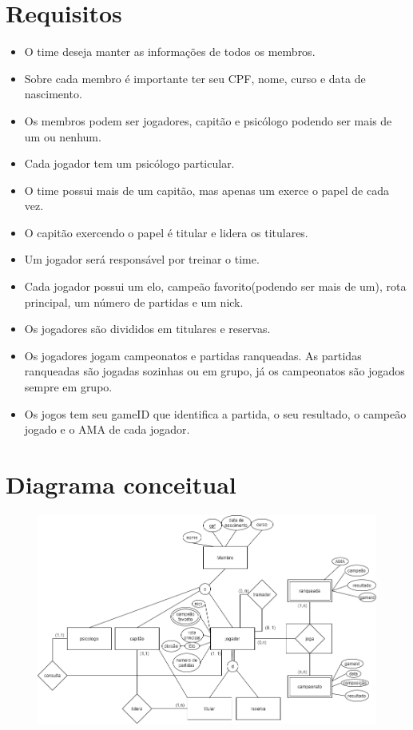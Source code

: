 \documentclass[]{article}
\begin{document}
\section{Requisitos}
\begin{itemize}
    \item O time deseja manter as informações de todos os membros.
    \item Sobre cada membro é importante ter seu CPF, nome, curso e data de nascimento.
    \item Os membros podem ser jogadores, capitão e psicólogo podendo ser mais de um ou nenhum.
    \item Cada jogador tem um psicólogo particular.
    \item O time possui mais de um capitão, mas apenas um exerce o papel de cada vez.
    \item O capitão exercendo o papel é titular e lidera os titulares.
    \item Um jogador será responsável por treinar o time.
    \item Cada jogador possui um elo, campeão favorito(podendo ser mais de um), rota principal, um número de partidas e um nick.
    \item Os jogadores são divididos em titulares e reservas.
    \item Os jogadores  jogam campeonatos e partidas ranqueadas. As partidas ranqueadas são jogadas sozinhas ou em grupo, já os campeonatos são jogados sempre em grupo.
    \item Os jogos tem seu gameID que identifica a partida, o seu resultado, o campeão jogado e o  AMA de cada jogador.
\end{itemize}


\section{Diagrama conceitual}
\begin{figure}[H]
    \centering
    \includegraphics[width=17cm]{conceitual}
\end{figure}
\end{document}
